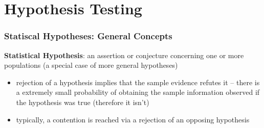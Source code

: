 \documentclass[10pt]{article}
\begin{document}
\newpage
\part{Hypothesis Testing}

\section{Statiscal Hypotheses: General Concepts}
\begin{definition}
    \textbf{Statistical Hypothesis}: an assertion or conjecture concerning one or more populations (a special case of more general hypotheses)
\end{definition}
\begin{itemize}
    \item rejection of a hypothesis implies that the sample evidence refutes it -- there is a extremely small probability of obtaining the sample information observed if the hypothesis was true (therefore it isn't)
    \item typically, a contention is reached via a rejection of an opposing hypothesis
\end{itemize}
\end{document}
